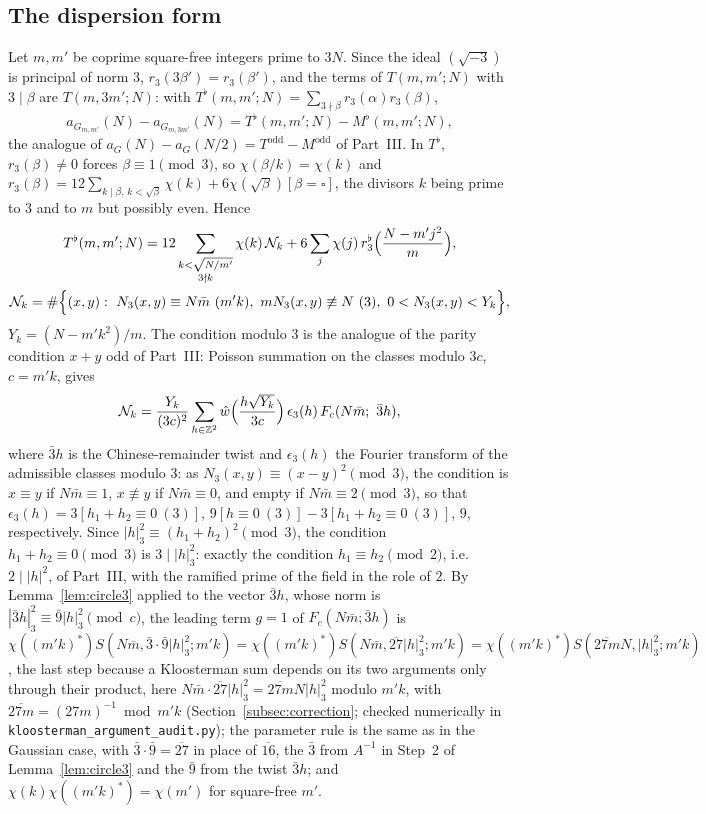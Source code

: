 \documentclass[11pt]{amsart}
\theoremstyle{remark}
\newcommand{\Z}{\mathbb{Z}}
\begin{document}
\subsection{The dispersion form}
Let $m,m'$ be coprime square-free integers prime to $3N$. Since the ideal $(\sqrt{-3})$ is principal of norm $3$, $r_3(3\beta')=r_3(\beta')$, and the terms of $T(m,m';N)$ with $3\mid\beta$ are $T(m,3m';N)$: with $T^\flat(m,m';N)=\sum_{3\nmid\beta}r_3(\alpha)r_3(\beta)$,
\[
a_{G_{m,m'}}(N)-a_{G_{m,3m'}}(N)=T^\flat(m,m';N)-M^\flat(m,m';N),
\]
the analogue of $a_G(N)-a_G(N/2)=T^{\mathrm{odd}}-M^{\mathrm{odd}}$ of Part~III. In $T^\flat$, $r_3(\beta)\ne0$ forces $\beta\equiv1\pmod3$, so $\chi(\beta/k)=\chi(k)$ and $r_3(\beta)=12\sum_{k\mid\beta,\,k<\sqrt\beta}\chi(k)+6\chi(\sqrt\beta)[\beta=\square]$, the divisors $k$ being prime to $3$ and to $m$ but possibly even. Hence
\begin{gather*}
T^\flat(m,m';N)=12\sum_{\substack{k<\sqrt{N/m'}\\ 3\nmid k}}\chi(k)\,\mathcal N_k+6\sum_j\chi(j)\,r_3^\flat\Bigl(\frac{N-m'j^2}m\Bigr),\\
\mathcal N_k=\#\Bigl\{(x,y):\ N_3(x,y)\equiv N\bar m\ (m'k),\ mN_3(x,y)\not\equiv N\ (3),\ 0<N_3(x,y)<Y_k\Bigr\},
\end{gather*}
$Y_k=(N-m'k^2)/m$. The condition modulo $3$ is the analogue of the parity condition $x+y$ odd of Part~III: Poisson summation on the classes modulo $3c$, $c=m'k$, gives
\[
\mathcal N_k=\frac{Y_k}{(3c)^2}\sum_{h\in\Z^2}\hat w\Bigl(\frac{h\sqrt{Y_k}}{3c}\Bigr)\,\epsilon_3(h)\,F_c(N\bar m;\ \bar3h),
\]
where $\bar3h$ is the Chinese-remainder twist and $\epsilon_3(h)$ the Fourier transform of the admissible classes modulo $3$: as $N_3(x,y)\equiv(x-y)^2\pmod3$, the condition is $x\equiv y$ if $N\bar m\equiv1$, $x\not\equiv y$ if $N\bar m\equiv0$, and empty if $N\bar m\equiv2\pmod3$, so that $\epsilon_3(h)=3[h_1+h_2\equiv0\ (3)]$, $9[h\equiv0\ (3)]-3[h_1+h_2\equiv0\ (3)]$, $9$, respectively. Since $|h|_3^2\equiv(h_1+h_2)^2\pmod3$, the condition $h_1+h_2\equiv0\pmod3$ is $3\mid|h|_3^2$: exactly the condition $h_1\equiv h_2\pmod2$, i.e.\ $2\mid|h|^2$, of Part~III, with the ramified prime of the field in the role of $2$. By Lemma~\ref{lem:circle3} applied to the vector $\bar3h$, whose norm is $|\bar3h|_3^2\equiv\bar9|h|_3^2\pmod c$, the leading term $g=1$ of $F_c(N\bar m;\bar3h)$ is $\chi((m'k)^{*})S(N\bar m,\bar3\cdot\bar9|h|_3^2;m'k)=\chi((m'k)^{*})S(N\bar m,\overline{27}|h|_3^2;m'k)=\chi((m'k)^{*})S(\overline{27m}N,|h|_3^2;m'k)$, the last step because a Kloosterman sum depends on its two arguments only through their product, here $N\bar m\cdot\overline{27}|h|_3^2=\overline{27m}N|h|_3^2$ modulo $m'k$, with $\overline{27m}=(27m)^{-1}\bmod m'k$ (Section~\ref{subsec:correction}; checked numerically in \texttt{kloosterman\_argument\_audit.py}); the parameter rule is the same as in the Gaussian case, with $\bar3\cdot\bar9=\overline{27}$ in place of $\overline{16}$, the $\bar3$ from $A^{-1}$ in Step~2 of Lemma~\ref{lem:circle3} and the $\bar9$ from the twist $\bar3h$; and $\chi(k)\chi((m'k)^{*})=\chi(m')$ for square-free $m'$.
\end{document}
